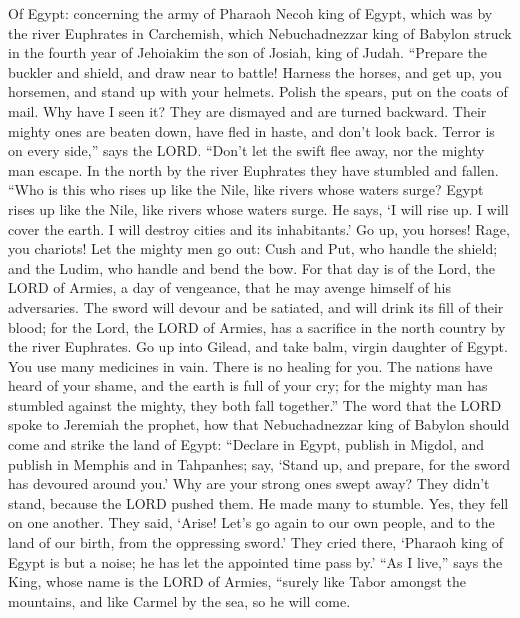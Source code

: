  Of Egypt: concerning the army of Pharaoh Necoh king of
Egypt, which was by the river Euphrates in Carchemish, which
Nebuchadnezzar king of Babylon struck in the fourth year of Jehoiakim
the son of Josiah, king of Judah.  ``Prepare the buckler and
shield, and draw near to battle!  Harness the horses, and
get up, you horsemen, and stand up with your helmets. Polish the spears,
put on the coats of mail.  Why have I seen it? They are
dismayed and are turned backward. Their mighty ones are beaten down,
have fled in haste, and don't look back. Terror is on every side,'' says
the LORD.  ``Don't let the swift flee away, nor the mighty
man escape. In the north by the river Euphrates they have stumbled and
fallen.  ``Who is this who rises up like the Nile, like
rivers whose waters surge?  Egypt rises up like the Nile,
like rivers whose waters surge. He says, `I will rise up. I will cover
the earth. I will destroy cities and its inhabitants.'  Go
up, you horses! Rage, you chariots! Let the mighty men go out: Cush and
Put, who handle the shield; and the Ludim, who handle and bend the bow.
 For that day is of the Lord, the LORD of Armies, a day of
vengeance, that he may avenge himself of his adversaries. The sword will
devour and be satiated, and will drink its fill of their blood; for the
Lord, the LORD of Armies, has a sacrifice in the north country by the
river Euphrates.  Go up into Gilead, and take balm, virgin
daughter of Egypt. You use many medicines in vain. There is no healing
for you.  The nations have heard of your shame, and the
earth is full of your cry; for the mighty man has stumbled against the
mighty, they both fall together.''  The word that the LORD
spoke to Jeremiah the prophet, how that Nebuchadnezzar king of Babylon
should come and strike the land of Egypt:  ``Declare in
Egypt, publish in Migdol, and publish in Memphis and in Tahpanhes; say,
`Stand up, and prepare, for the sword has devoured around you.'
 Why are your strong ones swept away? They didn't stand,
because the LORD pushed them.  He made many to stumble.
Yes, they fell on one another. They said, `Arise! Let's go again to our
own people, and to the land of our birth, from the oppressing sword.'
 They cried there, `Pharaoh king of Egypt is but a noise;
he has let the appointed time pass by.'  ``As I live,''
says the King, whose name is the LORD of Armies, ``surely like Tabor
amongst the mountains, and like Carmel by the sea, so he will come.
